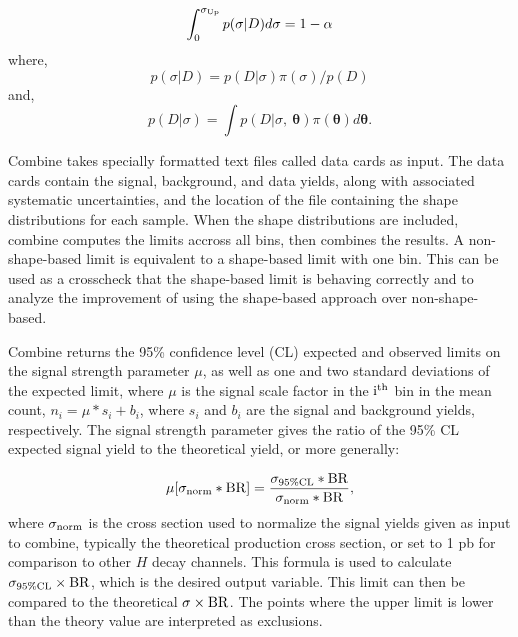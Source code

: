 \begin{equation}\label{eq:pCL}
\int_0^{\sigma_{\rm{Up}}} p(\sigma|D)d\sigma = 1 - \alpha
\end{equation}
where,
\begin{equation}\label{eq:pbayes}
p(\sigma|D) = p(D|\sigma)\pi(\sigma) / p(D)
\end{equation}
and,
\begin{equation}\label{eq:pmarg}
p(D|\sigma) = \int p(D|\sigma,\ \bm{\theta}) \pi(\bm{\theta}) d\bm{\theta}.
\end{equation}

Combine takes specially formatted text files called data cards as input. The data cards contain the signal, background, and data yields, along with associated systematic uncertainties, and the location of the file containing the shape distributions for each sample. When the shape distributions are included, combine computes the limits accross all bins, then combines the results. A non-shape-based limit is equivalent to a shape-based limit with one bin. This can be used as a crosscheck that the shape-based limit is behaving correctly and to analyze the improvement of using the shape-based approach over non-shape-based.

Combine returns the 95\% confidence level (CL) expected and observed limits on the signal strength parameter $\mu$, as well as one and two standard deviations of the expected limit, where $\mu$ is the signal scale factor in the $\rm{i}^{\rm{th}}$ bin in the mean count, $n_i = \mu * s_i + b_i$, where $s_i$ and $b_i$ are the signal and background yields, respectively.
The signal strength parameter gives the ratio of the 95\% CL expected signal yield to the theoretical yield, or more generally:

\begin{equation}\label{eq:mu}
\mu[\sigma_{\rm{norm}}*\rm{BR}] = \frac{\sigma_{95\% \rm{CL}}*\rm{BR}}{\sigma_{\rm{norm}}*\rm{BR}},
\end{equation}
where $\sigma_{\rm{norm}}$ is the cross section used to normalize the signal yields given as input to combine, typically the theoretical production cross section, or set to 1 pb for comparison to other $H$ decay channels. This formula is used to calculate $\sigma_{95\% \rm{CL}}\times \rm{BR}$, which is the desired output variable. This limit can then be compared to the theoretical $\sigma\times \rm{BR}$. The points where the upper limit is lower than the theory value are interpreted as exclusions.


